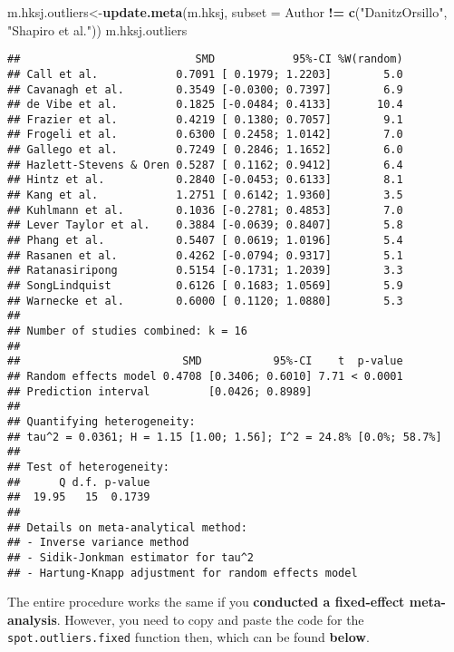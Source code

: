 \documentclass[]{book}
\newenvironment{Shaded}{\begin{snugshade}}{\end{snugshade}}
\newcommand{\KeywordTok}[1]{\textcolor[rgb]{0.13,0.29,0.53}{\textbf{#1}}}
\newcommand{\DataTypeTok}[1]{\textcolor[rgb]{0.13,0.29,0.53}{#1}}
\newcommand{\StringTok}[1]{\textcolor[rgb]{0.31,0.60,0.02}{#1}}
\newcommand{\OperatorTok}[1]{\textcolor[rgb]{0.81,0.36,0.00}{\textbf{#1}}}
\newcommand{\NormalTok}[1]{#1}
\theoremstyle{definition}
\theoremstyle{definition}
\theoremstyle{definition}
\theoremstyle{remark}
\begin{document}
\begin{Shaded}
\begin{Highlighting}[]
\NormalTok{m.hksj.outliers<-}\KeywordTok{update.meta}\NormalTok{(m.hksj,}
                             \DataTypeTok{subset =}\NormalTok{ Author }\OperatorTok{!=}\StringTok{ }\KeywordTok{c}\NormalTok{(}\StringTok{"DanitzOrsillo"}\NormalTok{,}
                                                  \StringTok{"Shapiro et al."}\NormalTok{))}
\NormalTok{m.hksj.outliers}
\end{Highlighting}
\end{Shaded}

\begin{verbatim}
##                           SMD            95%-CI %W(random)
## Call et al.            0.7091 [ 0.1979; 1.2203]        5.0
## Cavanagh et al.        0.3549 [-0.0300; 0.7397]        6.9
## de Vibe et al.         0.1825 [-0.0484; 0.4133]       10.4
## Frazier et al.         0.4219 [ 0.1380; 0.7057]        9.1
## Frogeli et al.         0.6300 [ 0.2458; 1.0142]        7.0
## Gallego et al.         0.7249 [ 0.2846; 1.1652]        6.0
## Hazlett-Stevens & Oren 0.5287 [ 0.1162; 0.9412]        6.4
## Hintz et al.           0.2840 [-0.0453; 0.6133]        8.1
## Kang et al.            1.2751 [ 0.6142; 1.9360]        3.5
## Kuhlmann et al.        0.1036 [-0.2781; 0.4853]        7.0
## Lever Taylor et al.    0.3884 [-0.0639; 0.8407]        5.8
## Phang et al.           0.5407 [ 0.0619; 1.0196]        5.4
## Rasanen et al.         0.4262 [-0.0794; 0.9317]        5.1
## Ratanasiripong         0.5154 [-0.1731; 1.2039]        3.3
## SongLindquist          0.6126 [ 0.1683; 1.0569]        5.9
## Warnecke et al.        0.6000 [ 0.1120; 1.0880]        5.3
## 
## Number of studies combined: k = 16
## 
##                         SMD           95%-CI    t  p-value
## Random effects model 0.4708 [0.3406; 0.6010] 7.71 < 0.0001
## Prediction interval         [0.0426; 0.8989]              
## 
## Quantifying heterogeneity:
## tau^2 = 0.0361; H = 1.15 [1.00; 1.56]; I^2 = 24.8% [0.0%; 58.7%]
## 
## Test of heterogeneity:
##      Q d.f. p-value
##  19.95   15  0.1739
## 
## Details on meta-analytical method:
## - Inverse variance method
## - Sidik-Jonkman estimator for tau^2
## - Hartung-Knapp adjustment for random effects model
\end{verbatim}

The entire procedure works the same if you \textbf{conducted a
fixed-effect meta-analysis}. However, you need to copy and paste the
code for the \texttt{spot.outliers.fixed} function then, which can be
found \textbf{below}.
\end{document}
